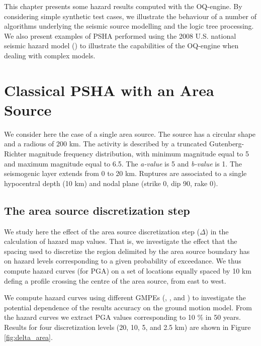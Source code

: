 This chapter presents some hazard results computed with the OQ-engine. By
considering simple synthetic test cases, we illustrate the behaviour of a number
of algorithms underlying the seismic source modelling and the logic tree
processing. We also present examples of PSHA performed using the 2008 
U.S. national seismic hazard model (\cite{petersen2008}) to illustrate the
capabilities of the OQ-engine when dealing with complex models.
%
\section{Classical PSHA with an Area Source} 
We consider here the case of a single area source. The source has a circular
shape and a radious of 200 km.  The activity is described by a truncated
Gutenberg-Richter magnitude frequency distribution, with minimum magnitude equal
to 5 and maximum magnitude equal to 6.5. The \textit{a-value} is 5
and \textit{b-value} is 1.
The seismogenic layer extends from 0 to 20 km.  Ruptures are associated to a
single hypocentral depth (10 km) and nodal plane (strike 0, dip 90, rake 0).
%
\subsection{The area source discretization step} 
We study here the effect of the area source discretization step ($\Delta$) in
the calculation of hazard map values. That is, we investigate the effect that
the spacing used to discretize the region delimited by the area source boundary
has on hazard levels corresponding to a given probability of exceedance. We thus
compute hazard curves (for PGA) on a set of locations equally spaced by 10 km
defing a profile crossing the centre of the area source, from east to west.

We compute hazard curves using different GMPEs (\cite{boore2008},
\cite{chiou2008}, \cite{campbell2008} and \cite{abrahamson2008}) to investigate
the potential dependence of the results accuracy on the ground motion model.
From the hazard curves we extract PGA values corresponding to 10 \% in 50 years.
Results for four discretization levels (20, 10, 5, and 2.5 km) are shown in
Figure \ref{fig:delta_area}. 

